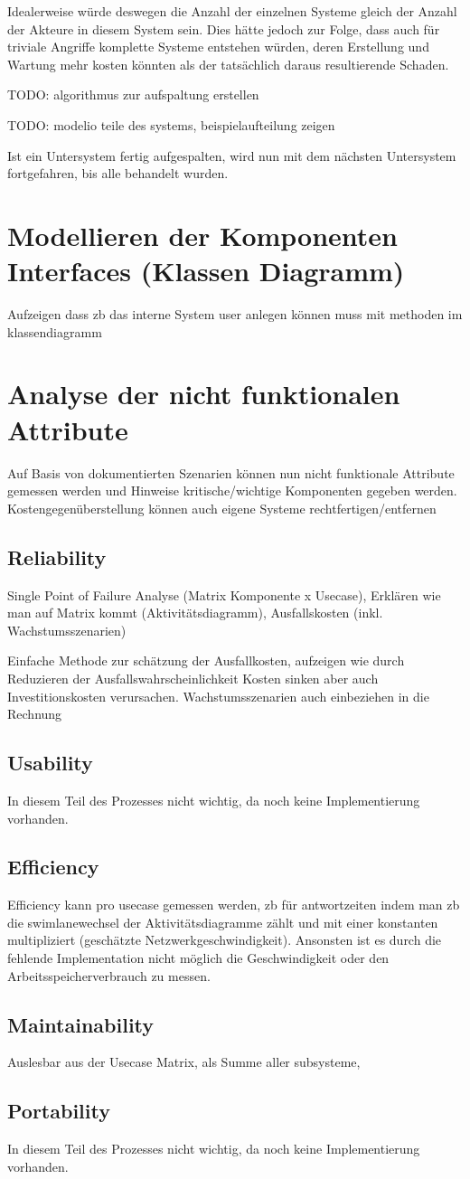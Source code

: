 Idealerweise würde deswegen die Anzahl der einzelnen Systeme gleich der Anzahl der Akteure in diesem System sein. Dies hätte jedoch zur Folge, dass auch für triviale Angriffe komplette Systeme entstehen würden, deren Erstellung und Wartung mehr kosten könnten als der tatsächlich daraus resultierende Schaden.

TODO: algorithmus zur aufspaltung erstellen

TODO: modelio teile des systems, beispielaufteilung zeigen

Ist ein Untersystem fertig aufgespalten, wird nun mit dem nächsten Untersystem fortgefahren, bis alle behandelt wurden.

\section{Modellieren der Komponenten Interfaces (Klassen Diagramm)}
Aufzeigen dass zb das interne System user anlegen können muss mit methoden im klassendiagramm

\section{Analyse der nicht funktionalen Attribute}
Auf Basis von dokumentierten Szenarien können nun nicht funktionale Attribute gemessen werden und Hinweise kritische/wichtige Komponenten gegeben werden. Kostengegenüberstellung können auch eigene Systeme rechtfertigen/entfernen

\subsection{Reliability}
Single Point of Failure Analyse (Matrix Komponente x Usecase), Erklären wie man auf Matrix kommt (Aktivitätsdiagramm), Ausfallskosten (inkl. Wachstumsszenarien)

Einfache Methode zur schätzung der Ausfallkosten, aufzeigen wie durch Reduzieren der Ausfallswahrscheinlichkeit Kosten sinken aber auch Investitionskosten verursachen. Wachstumsszenarien auch einbeziehen in die Rechnung
\subsection{Usability}
In diesem Teil des Prozesses nicht wichtig, da noch keine Implementierung vorhanden.

\subsection{Efficiency}
Efficiency kann pro usecase gemessen werden, zb für antwortzeiten indem man zb die swimlanewechsel der Aktivitätsdiagramme zählt und mit einer konstanten multipliziert (geschätzte Netzwerkgeschwindigkeit). Ansonsten ist es durch die fehlende Implementation nicht möglich die Geschwindigkeit oder den Arbeitsspeicherverbrauch zu messen.

\subsection{Maintainability}
Auslesbar aus der Usecase Matrix, als Summe aller subsysteme,

\subsection{Portability}
In diesem Teil des Prozesses nicht wichtig, da noch keine Implementierung vorhanden.
